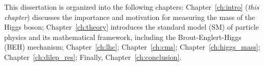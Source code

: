 This dissertation is organized into the following chapters:
Chapter~\ref{ch:intro} (\emph{this chapter}) discusses the importance and motivation for measuring the mass of the Higgs boson;
Chapter~\ref{ch:theory} introduces the standard model (SM) of particle physics and its mathematical framework, including the Brout-Englert-Higgs (BEH) mechanism;
Chapter~\ref{ch:lhc};
Chapter~\ref{ch:cms};
Chapter~\ref{ch:higgs_mass};
Chapter~\ref{ch:dilep_res};
Finally, Chapter~\ref{ch:conclusion}.

